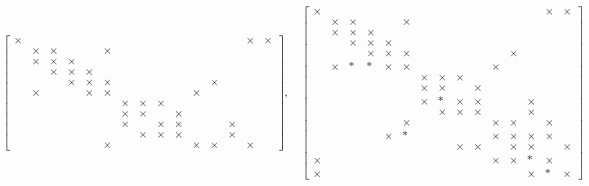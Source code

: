 $$
\begin{bmatrix}
\times &  &  &  &  &  &  &  &  &  &  &  &  & \times & \times\\
 & \times & \times &  &  & \times &  &  &  &  &  &  &  &  & \\
 & \times & \times & \times &  &  &  &  &  &  &  &  &  &  & \\
 &  & \times & \times & \times &  &  &  &  &  &  &  &  &  & \\
 &  &  & \times & \times & \times &  &  &  &  &  & \times &  &  & \\
 & \times &  &  & \times & \times &  &  &  &  & \times &  &  &  & \\
 &  &  &  &  &  & \times & \times & \times &  &  &  &  &  & \\
 &  &  &  &  &  & \times & \times &  & \times &  &  &  &  & \\
 &  &  &  &  &  & \times &  & \times & \times &  &  & \times &  & \\
 &  &  &  &  &  &  & \times & \times & \times &  &  & \times &  & \\
 &  &  &  &  & \times &  &  &  &  & \times & \times &  & \times & \end{bmatrix}, \quad
\begin{bmatrix}
\times &  &  &  &  &  &  &  &  &  &  &  &  & \times & \times\\
 & \times & \times &  &  & \times &  &  &  &  &  &  &  &  & \\
 & \times & \times & \times &  &  &  &  &  &  &  &  &  &  & \\
 &  & \times & \times & \times &  &  &  &  &  &  &  &  &  & \\
 &  &  & \times & \times & \times &  &  &  &  &  & \times &  &  & \\
 & \times & * & * & \times & \times &  &  &  &  & \times &  &  &  & \\
 &  &  &  &  &  & \times & \times & \times &  &  &  &  &  & \\
 &  &  &  &  &  & \times & \times &  & \times &  &  &  &  & \\
 &  &  &  &  &  & \times & * & \times & \times &  &  & \times &  & \\
 &  &  &  &  &  &  & \times & \times & \times &  &  & \times &  & \\
 &  &  &  &  & \times &  &  &  &  & \times & \times &  & \times & \\
 &  &  &  & \times & * &  &  &  &  & \times & \times & \times & \times & \\
 &  &  &  &  &  &  &  & \times & \times &  & \times & \times &  & \times\\
\times &  &  &  &  &  &  &  &  &  & \times & \times & * & \times & \\
\times &  &  &  &  &  &  &  &  &  &  &  & \times & * & \times\end{bmatrix}
$$
